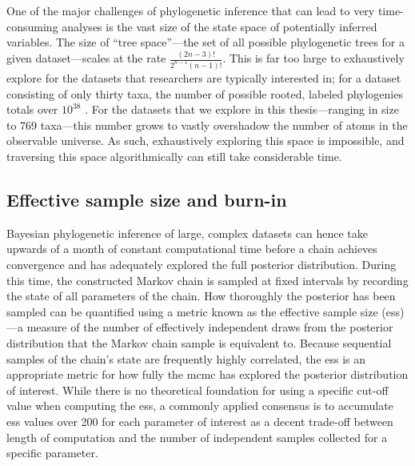 One of the major challenges of phylogenetic inference that can lead to very time-consuming analyses is the vast size of the state space of potentially inferred variables.
The size of ``tree space''---the set of all possible phylogenetic trees for a given dataset---scales at the rate $\frac{(2n-3)!}{2^{n-1}(n-1)!}$.
This is far too large to exhaustively explore for the datasets that researchers are typically interested in; for a dataset consisting of only thirty taxa, the number of possible rooted, labeled phylogenies totals over $10^{38}$ \cite{felsenstein2003inferring}.
For the datasets that we explore in this thesis---ranging in size to 769 taxa---this number grows to vastly overshadow the number of atoms in the observable universe.
As such, exhaustively exploring this space is impossible, and traversing this space algorithmically can still take considerable time.

\subsection{Effective sample size and burn-in}
\label{sec:ess}

Bayesian phylogenetic inference of large, complex datasets can hence take upwards of a month of constant computational time before a chain achieves convergence and has adequately explored the full posterior distribution.
During this time, the constructed Markov chain is sampled at fixed intervals by recording the state of all parameters of the chain.
How thoroughly the posterior has been sampled can be quantified using a metric known as the effective sample size (\gls{ess})---a measure of the number of effectively independent draws from the posterior distribution that the Markov chain sample is equivalent to.
Because sequential samples of the chain's state are frequently highly correlated, the \gls{ess} is an appropriate metric for how fully the \gls{mcmc} has explored the posterior distribution of interest.
While there is no theoretical foundation for using a specific cut-off value when computing the \gls{ess}, a commonly applied consensus is to accumulate \gls{ess} values over 200 for each parameter of interest as a decent trade-off between length of computation and the number of independent samples collected for a specific parameter.

